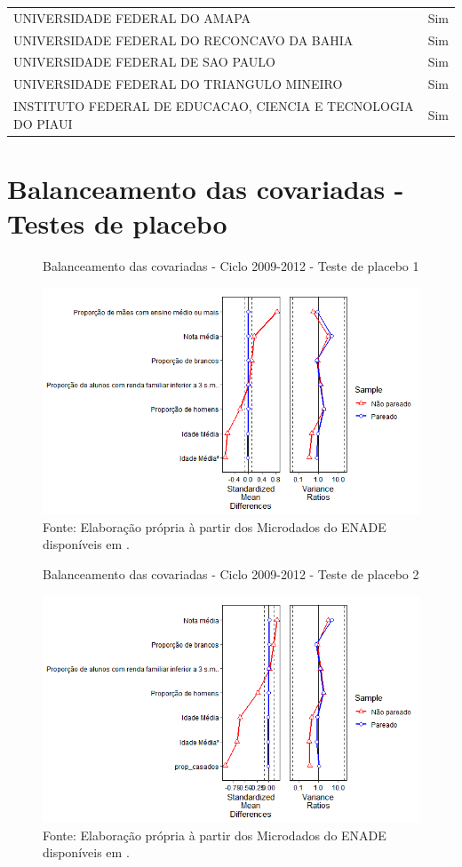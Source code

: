 {\begin{center}
\begin{longtable}[H]{ll}
\multicolumn{1}{l}{UNIVERSIDADE FEDERAL DO AMAPA} & \multicolumn{1}{l}{Sim} \\ 
\multicolumn{1}{l}{UNIVERSIDADE FEDERAL DO RECONCAVO DA BAHIA} & \multicolumn{1}{l}{Sim} \\ 
\multicolumn{1}{l}{UNIVERSIDADE FEDERAL DE SAO PAULO} & \multicolumn{1}{l}{Sim} \\ 
\multicolumn{1}{l}{UNIVERSIDADE FEDERAL DO TRIANGULO MINEIRO} & \multicolumn{1}{l}{Sim} \\ 
\multicolumn{1}{l}{INSTITUTO FEDERAL DE EDUCACAO, CIENCIA E TECNOLOGIA DO PIAUI} & \multicolumn{1}{l}{Sim} \\[-1.8ex] 
\end{longtable}
\end{center}
}

\section{Balanceamento das covariadas - Testes de placebo}

\begin{figure}[H]
	\centering
	\caption{Balanceamento das covariadas - Ciclo 2009-2012 - Teste de placebo 1}
	\label{fig:balanceamento_covariadas_2009_2012_placebo_1}
	\includegraphics[width=0.7\linewidth]{"Figuras/balanceamento_covariadas_2009_2012_placebo1.png"}
	\caption*{\RaggedRight Fonte: Elaboração própria à partir dos Microdados do ENADE disponíveis em \cite{INEP2020}.}
\end{figure}

\begin{figure}[H]
	\centering
	\caption{Balanceamento das covariadas - Ciclo 2009-2012 - Teste de placebo 2}
	\label{fig:balanceamento_covariadas_2009_2012_placebo_2}
	\includegraphics[width=0.7\linewidth]{"Figuras/balanceamento_covariadas_2009_2012_placebo2.png"}
\caption*{\RaggedRight Fonte: Elaboração própria à partir dos Microdados do ENADE disponíveis em \cite{INEP2020}.}
\end{figure}

